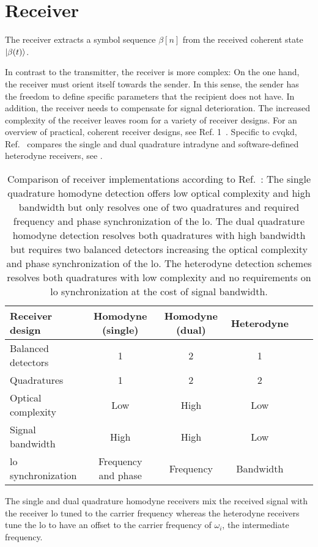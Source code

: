 \section{Receiver}

The receiver extracts a symbol sequence $\beta[n]$ from the received coherent state $\lvert\beta(t)\rangle$.

In contrast to the transmitter, the receiver is more complex:
On the one hand, the receiver must orient itself towards the sender.
In this sense, the sender has the freedom to define specific parameters that the recipient does not have.
In addition, the receiver needs to compensate for signal deterioration.
The increased complexity of the receiver leaves room for a variety of receiver designs.
For an overview of practical, coherent receiver designs, see Ref. 1~\cite{Kikuchi2016}.
Specific to \gls{cvqkd}, Ref.~\cite{Brunner2017} compares the single and dual quadrature intradyne and software-defined heterodyne receivers, see .
\begin{table}[htb]
  \centering
  \begin{tabular}{lccccc}
    \toprule
    Receiver design & Homodyne (single) & Homodyne (dual) & Heterodyne \\
    \midrule
    Balanced detectors & \num{1} & \num{2} & \num{1} \\
    Quadratures & \num{1} & \num{2} & \num{2} \\
    Optical complexity & Low & High & Low \\
    Signal bandwidth & High & High & Low \\
    \gls{lo} synchronization & Frequency and phase & Frequency & Bandwidth \\
    \bottomrule
  \end{tabular}
  \caption{Comparison of receiver implementations according to Ref.~\cite{Brunner2017}: The single quadrature homodyne detection offers low optical complexity and high bandwidth but only resolves one of two quadratures and required frequency and phase synchronization of the \gls{lo}. The dual quadrature homodyne detection resolves both quadratures with high bandwidth but requires two balanced detectors increasing the optical complexity and phase synchronization of the \gls{lo}. The heterodyne detection schemes resolves both quadratures with low complexity and no requirements on \gls{lo} synchronization at the cost of signal bandwidth.}\label{tab:receivers}
\end{table}
The single and dual quadrature homodyne receivers mix the received signal with the receiver \gls{lo} tuned to the carrier frequency whereas the heterodyne receivers tune the \gls{lo} to have an offset to the carrier frequency of $\omega_i$, the intermediate frequency.
